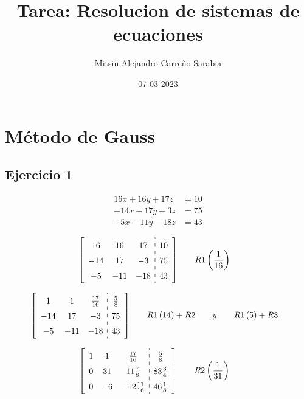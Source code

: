 \documentclass[fleqn]{article}
\title{Tarea: Resolucion de sistemas de ecuaciones}
\date{07-03-2023}
\author{Mitsiu Alejandro Carreño Sarabia}
\begin{document}
\maketitle
{}
\newpage
{}

\section{Método de Gauss}
  \subsection{Ejercicio 1}
    \begin{align*}
      16x+16y+17z&=10\\
      -14x+17y-3z&=75\\
      -5x-11y-18z&=43 
    \end{align*}
  
    \begin{alignat*}{2}
      &\left[
        \begin{array}{ccc:c}
          16 & 16 & 17 & 10 \\
          -14 & 17 & -3 & 75\\
          -5 & -11 & -18 & 43
        \end{array}
      \right] 
      \quad 
      && R1\left(\frac{1}{16}\right)
    \end{alignat*}

    \begin{alignat*}{2}
      &\left[\def\arraystretch{1.5}
        \begin{array}{ccc:c}
          1 & 1 & \frac{17}{16} & \frac{5}{8} \\
          -14 & 17 & -3 & 75\\
          -5 & -11 & -18 & 43
        \end{array}
      \right] 
      \quad 
      && R1\left(14\right)+R2 \qquad y \qquad R1\left(5\right)+R3
    \end{alignat*}

    \begin{alignat*}{2}
      &\left[\def\arraystretch{1.5}
        \begin{array}{ccc:c}
          1 & 1 & \frac{17}{16} & \frac{5}{8} \\
          0 & 31 & 11\frac{7}{8} & 83\frac{3}{4} \\
          0 & -6 & -12\frac{11}{16} & 46\frac{1}{8}
        \end{array}
      \right]
      \quad
      && R2\left(\frac{1}{31}\right)
    \end{alignat*}
    
\end{document}

